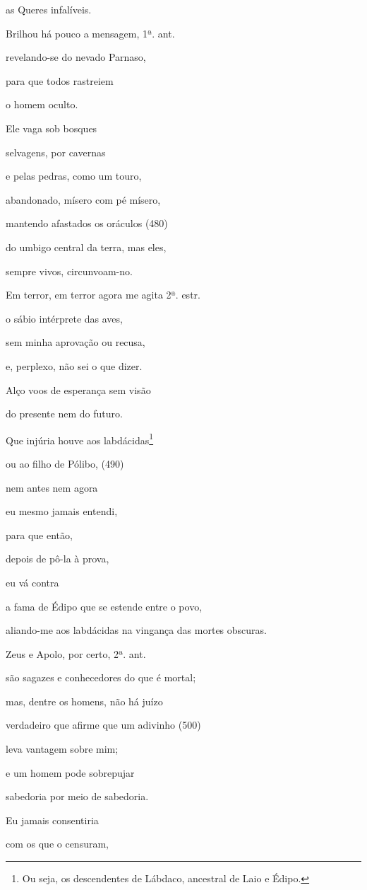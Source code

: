 as Queres infalíveis.

Brilhou há pouco a mensagem, 1ª. ant.

revelando-se do nevado Parnaso,

para que todos rastreiem

o homem oculto.

Ele vaga sob bosques

selvagens, por cavernas

e pelas pedras, como um touro,

abandonado, mísero com pé mísero,

mantendo afastados os oráculos (480)

do umbigo central da terra, mas eles,

sempre vivos, circunvoam-no.

Em terror, em terror agora me agita 2ª. estr.

o sábio intérprete das aves,

sem minha aprovação ou recusa,

e, perplexo, não sei o que dizer.

Alço voos de esperança sem visão

do presente nem do futuro.

Que injúria houve aos labdácidas\footnote{Ou seja, os descendentes de
  Lábdaco, ancestral de Laio e Édipo.}

ou ao filho de Pólibo, (490)

nem antes nem agora

eu mesmo jamais entendi,

para que então,

depois de pô-la à prova,

eu vá contra

a fama de Édipo que se estende entre o povo,

aliando-me aos labdácidas na vingança das mortes obscuras.

Zeus e Apolo, por certo, 2ª. ant.

são sagazes e conhecedores do que é mortal;

mas, dentre os homens, não há juízo

verdadeiro que afirme que um adivinho (500)

leva vantagem sobre mim;

e um homem pode sobrepujar

sabedoria por meio de sabedoria.

Eu jamais consentiria

com os que o censuram,


